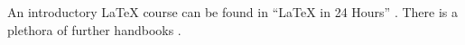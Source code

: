 An introductory \LaTeX{} course can be found in \enquote{\LaTeX{} in 24 Hours} \cite{datta2017}.
There is a plethora of further handbooks \cite*[e.\,g.,][]{goossensmittelbach2010}.



